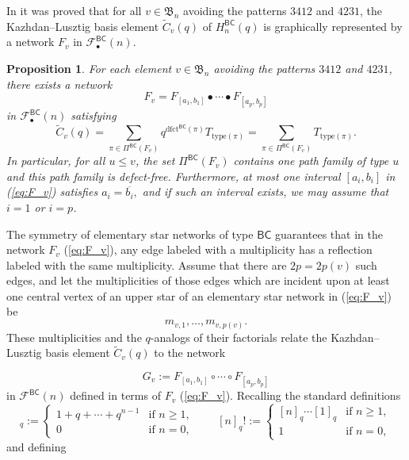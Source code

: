 \documentclass[12pt]{amsart}
\newtheorem{prop}[thm]{Proposition}
\theoremstyle{definition}
\numberwithin{equation}{section}
\newcommand{\bn}{\mathfrak{B}_n}
\newcommand{\ol}[1]{\overline{#1}}
\newcommand{\hbnq}{H_n^{\msfBC}(q)}
\newcommand{\wtc}[2]{\widetilde{C}_{#1}(#2)}
\newcommand{\defeq}{:=}
\newcommand{\dfct}{\mathrm{dfct}}
\newcommand{\type}{\mathrm{type}}
\newcommand{\avoidingp}{avoiding the patterns $3412$ and $4231${}}
\newcommand{\PiBC}{\Pi^{\msfBC}}
\newcommand{\net}[2]{\mathcal F^{\mathsf{#1}}(#2)}
\newcommand{\bnet}[2]{\mathcal F^{\mathsf{#1}}_\bullet(#2)}
\newcommand{\msfBC}{\mathsf{BC}}
\begin{document}
In \cite[Thm.\,5.21]{SkanHyperGC} it was proved that for all $v \in \bn$ \avoidingp,
the Kazhdan--Lusztig basis element $\wtc vq$ of $\hbnq$ is graphically represented by a network $F_v$ in $\bnet{\msfBC}n$.
\begin{prop}\label{p:Fv}
    For each element $v \in \bn$ \avoidingp,
    there exists a network 
    \begin{equation}\label{eq:F_v}
    F_v = F_{[a_1,b_1]} \bullet \cdots \bullet F_{[a_p,b_p]}
    \end{equation}
    in $\bnet{\msfBC}n$ satisfying
    \begin{equation*}
        \wtc vq = \sum_{\pi \in \PiBC(F_v)} q^{\dfct^{\msfBC}(\pi)} T_{\type(\pi)} = \sum_{\pi \in \PiBC(F_v)} T_{\type(\pi)}.
    \end{equation*}
    In particular, for all $u \leq v$, the set $\PiBC(F_v)$ contains one path family of type $u$ and this path family is defect-free.  Furthermore,
    at most one interval $[a_i,b_i]$ in (\ref{eq:F_v}) satisfies $a_i = \ol{b_i},$ and if such an interval exists, we may assume that $i = 1$ or $i = p$.
    \end{prop}

The symmetry of elementary star networks of type $\msfBC$ guarantees that in the network $F_v$ (\ref{eq:F_v}), any edge labeled with a multiplicity has a reflection labeled with the same multiplicity. Assume that there are $2p = 2p(v)$ such edges,
and let the multiplicities of those edges which are incident upon at least one central vertex of an upper star of an 
elementary star network in (\ref{eq:F_v}) be \begin{equation}\label{eq:multiplicities}
m_{v,1},\dotsc,m_{v,p(v)}.
\end{equation}
These multiplicities and the $q$-analogs of their factorials relate the Kazhdan--Lusztig basis element $\wtc vq$ to the network 

\begin{equation}\label{eq:G_v}
G_v \defeq F_{[a_1,b_1]} \circ \cdots \circ F_{[a_p,b_p]}
\end{equation}
in $\net{\msfBC}n$ defined in terms of $F_v$ (\ref{eq:F_v}).
Recalling the standard definitions
\begin{equation*}
    [n]_q \defeq \begin{cases}
        1 + q + \cdots + q^{n-1} &\text{if $n \geq 1$},\\
        0 &\text{if $n=0$},
        \end{cases}
        \qquad
        [n]_q! \defeq
        \begin{cases}
[n]_q \cdots [1]_q
&\text{if $n \geq 1$},\\
1 &\text{if $n=0$},
        \end{cases}
\end{equation*}
and defining
\end{document}
